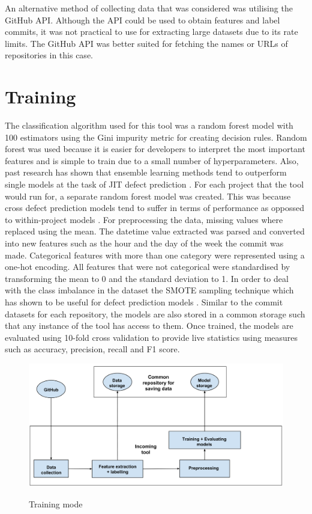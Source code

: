\documentclass[../main.tex]{subfiles}
\begin{document}
An alternative method of collecting data that was considered was utilising the GitHub API. Although the API could be used to obtain features and label commits, it was not practical to use for extracting large datasets due to its rate limits. The GitHub API was better suited for fetching the names or URLs of repositories in this case. 

\section{Training}

The classification algorithm used for this tool was a random forest model with 100 estimators using the Gini impurity metric for creating decision rules. Random forest was used because it is easier for developers to interpret the most important features and is simple to train due to a small number of hyperparameters. Also, past research has shown that ensemble learning methods tend to outperform single models at the task of JIT defect prediction \cite{yang2017tlel}. For each project that the tool would run for, a separate random forest model was created. This was because cross defect prediction models tend to suffer in terms of performance as oppossed to within-project models \cite{kamei2016studying}. For preprocessing the data, missing values where replaced using the mean. The datetime value extracted was parsed and converted into new features such as the hour and the day of the week the commit was made. Categorical features with more than one category were represented using a one-hot encoding. All features that were not categorical were standardised by transforming the mean to 0 and the standard deviation to 1. In order to deal with the class imbalance in the dataset the SMOTE sampling technique which has shown to be useful for defect prediction models \cite{tan2015online}. Similar to the commit datasets for each repository, the models are also stored in a common storage such that any instance of the tool has access to them. Once trained, the models are evaluated using 10-fold cross validation to provide live statistics using measures such as accuracy, precision, recall and F1 score. 

\vspace{10pt}

\begin{figure}[h]
\centering
\includegraphics[width=1\textwidth]{images/Technical_Contribution/incoming_1.png}
\label{fig:incoming1}
\caption{Training mode}
\end{figure}
\end{document}
